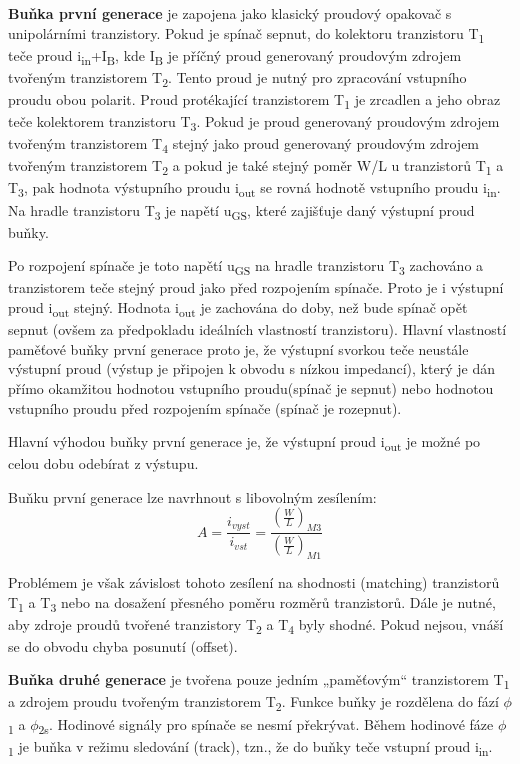 \textbf{Buňka první generace} je zapojena jako klasický proudový opakovač s unipolárními tranzistory. Pokud je spínač sepnut, do kolektoru tranzistoru T\textsubscript{1} teče proud i\textsubscript{in}+I\textsubscript{B}, kde I\textsubscript{B} je příčný proud generovaný proudovým zdrojem tvořeným tranzistorem T\textsubscript{2}. Tento proud je nutný pro zpracování vstupního proudu obou polarit. Proud protékající tranzistorem T\textsubscript{1} je zrcadlen a jeho obraz teče kolektorem tranzistoru T\textsubscript{3}. Pokud je proud generovaný proudovým zdrojem tvořeným tranzistorem T\textsubscript{4} stejný jako proud generovaný proudovým zdrojem tvořeným tranzistorem T\textsubscript{2} a pokud je také stejný poměr W/L u tranzistorů T\textsubscript{1} a T\textsubscript{3}, pak hodnota výstupního proudu i\textsubscript{out} se rovná hodnotě vstupního proudu i\textsubscript{in}. Na hradle tranzistoru T\textsubscript{3} je napětí u\textsubscript{GS}, které zajišťuje daný výstupní proud buňky. 

Po rozpojení spínače je toto napětí u\textsubscript{GS} na hradle tranzistoru T\textsubscript{3} zachováno a tranzistorem teče stejný proud jako před rozpojením spínače. Proto je i výstupní proud i\textsubscript{out} stejný. Hodnota i\textsubscript{out} je zachována do doby, než bude spínač opět sepnut (ovšem za předpokladu ideálních vlastností tranzistoru). Hlavní vlastností paměťové buňky první generace proto je, že výstupní svorkou teče neustále výstupní proud (výstup je připojen k obvodu s nízkou impedancí), který je dán přímo okamžitou hodnotou vstupního proudu(spínač je sepnut) nebo hodnotou vstupního proudu před rozpojením spínače (spínač je rozepnut).

Hlavní výhodou buňky první generace je, že výstupní proud i\textsubscript{out} je možné po celou dobu odebírat z výstupu.

Buňku první generace lze navrhnout s libovolným zesílením:
\begin{equation}
A = \frac{i_{vyst}}{i_{vst}}=\frac{(\frac{W}{L})_{M3}}{(\frac{W}{L})_{M1}}
\end{equation}

Problémem je však závislost tohoto zesílení na shodnosti (matching) tranzistorů T\textsubscript{1} a T\textsubscript{3} nebo na dosažení přesného poměru rozměrů tranzistorů. Dále je nutné, aby zdroje proudů tvořené tranzistory T\textsubscript{2} a T\textsubscript{4} byly shodné. Pokud nejsou, vnáší se do obvodu chyba posunutí (offset).


\textbf{Buňka druhé generace} je tvořena pouze jedním „paměťovým“ tranzistorem T\textsubscript{1} a zdrojem proudu tvořeným tranzistorem T\textsubscript{2}. Funkce buňky je rozdělena do fází $\phi$\textsubscript{1} a $\phi$\textsubscript{2s}. Hodinové signály pro spínače se nesmí překrývat. Během hodinové fáze $\phi$\textsubscript{1} je buňka v režimu sledování (track), tzn., že do buňky teče vstupní proud i\textsubscript{in}.

